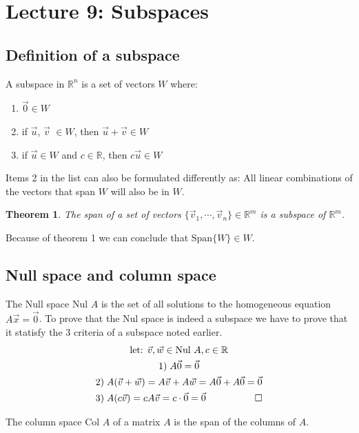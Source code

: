 \documentclass[11pt, a4paper]{article}
\newcommand*{\qed}{\hfill\ensuremath{\quad\square}}%
\newtheorem{theorem}{Theorem}
\begin{document}
\setcounter{section}{8}
\section{Lecture 9: Subspaces}
\subsection{Definition of a subspace}
A subspace in $\mathbb{R}^n$ is a set of vectors $W$ where:
\begin{enumerate}
  \item $\vec{0} \in W$
  \item if $\vec{u}$, $\vec{v}$ $\in W$, then $\vec{u} + \vec{v} \in W$
  \item if $\vec{u} \in W$ and $c \in \mathbb{R}$, then $c\vec{u} \in W$
\end{enumerate}

Items 2 in the list can also be formulated differently as: All linear combinations of the vectors that span $W$ will
also be in $W$.

\begin{theorem}
  The span of a set of vectors $\{ \vec{v}_1, \cdots, \vec{v}_n   \}\in \mathbb{R}^m$ is a subspace of $\mathbb{R}^m$.
\end{theorem}
Because of theorem 1 we can conclude that $\text{Span}\{ W\} \in W$.


\subsection{Null space and column space}
The Null space Nul $A$ is the set of all solutions to the homogeneous equation $A\vec{x} = \vec{0}$.
To prove that the Nul space is indeed a subspace we have to prove that it statisfy the 3 criteria of a 
subspace noted earlier.
\begin{gather}
  \text{let: } \vec{v},\vec{w} \in \text{Nul } A, c\in \mathbb{R} \notag\\
  1)\; A\vec{0} = \vec{0}\\
  2)\; A(\vec{v} + \vec{w}) = A\vec{v} + A\vec{w} = A\vec{0} + A\vec{0} = \vec{0}\\
  3)\; A(c\vec{v}) = cA\vec{v} = c\cdot \vec{0} = \vec{0} \qed
\end{gather}

The column space Col $A$ of a matrix $A$ is the span of the columns of $A$. 
\end{document}
